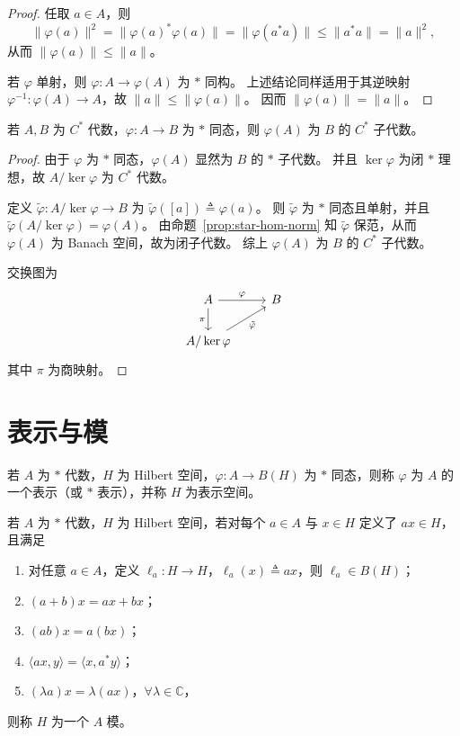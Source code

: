 \documentclass[lang=cn,a4paper,newtx,section]{elegantbook}
\begin{document}
  \begin{proof}
    任取 $a\in A$，则
    \begin{equation*}
      \|\varphi(a)\|^2=\|\varphi(a)^*\varphi(a)\|=\|\varphi(a^*a)\|\le \|a^*a\|=\|a\|^2,
    \end{equation*}
    从而 $\|\varphi(a)\|\le \|a\|$。

    若 $\varphi$ 单射，则 $\varphi:A\to \varphi(A)$ 为 $*$ 同构。
    上述结论同样适用于其逆映射 $\varphi^{-1}:\varphi(A)\to A$，故 $\|a\|\le \|\varphi(a)\|$。
    因而 $\|\varphi(a)\|=\|a\|$。
  \end{proof}

  \begin{corollary}
    若 $A,B$ 为 $C^*$ 代数，$\varphi:A\to B$ 为 $*$ 同态，则 $\varphi(A)$ 为 $B$ 的 $C^*$ 子代数。
  \end{corollary}

  \begin{proof}
    由于 $\varphi$ 为 $*$ 同态，$\varphi(A)$ 显然为 $B$ 的 $*$ 子代数。
    并且 $\ker\varphi$ 为闭 $*$ 理想，故 $A/\ker\varphi$ 为 $C^*$ 代数。

    定义 $\tilde\varphi:A/\ker\varphi\to B$ 为 $\tilde\varphi([a])\triangleq\varphi(a)$。
    则 $\tilde\varphi$ 为 $*$ 同态且单射，并且 $\tilde\varphi(A/\ker\varphi)=\varphi(A)$。
    由命题~\ref{prop:star-hom-norm} 知 $\tilde\varphi$ 保范，从而 $\varphi(A)$ 为 Banach 空间，故为闭子代数。
    综上 $\varphi(A)$ 为 $B$ 的 $C^*$ 子代数。

    交换图为
    \[
      \begin{tikzcd}
        A \arrow[r,"\varphi"] \arrow[d,"\pi"'] & B \\
        A/\ker\varphi \arrow[ur,"\tilde\varphi"'] &
      \end{tikzcd}
    \]
    其中 $\pi$ 为商映射。
  \end{proof}

  \section{表示与模}

  \begin{definition}
    若 $A$ 为 $*$ 代数，$H$ 为 Hilbert 空间，$\varphi:A\to B(H)$ 为 $*$ 同态，则称 $\varphi$ 为 $A$ 的一个表示（或 $*$ 表示），并称 $H$ 为表示空间。
  \end{definition}

  \begin{definition}
    若 $A$ 为 $*$ 代数，$H$ 为 Hilbert 空间，若对每个 $a\in A$ 与 $x\in H$ 定义了 $ax\in H$，且满足
    \begin{enumerate}
      \item 对任意 $a\in A$，定义 $\ell_a:H\to H$，$\ell_a(x)\triangleq ax$，则 $\ell_a\in B(H)$；
      \item $(a+b)x=ax+bx$；
      \item $(ab)x=a(bx)$；
      \item $\langle ax,y\rangle=\langle x,a^*y\rangle$；
      \item $(\lambda a)x=\lambda(ax)$，$\forall\lambda\in\mathbb{C}$，
    \end{enumerate}
    则称 $H$ 为一个 $A$ 模。
  \end{definition}
\end{document}
